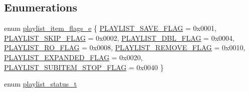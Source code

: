 \subsection*{Enumerations}
\begin{DoxyCompactItemize}
\item 
enum \hyperlink{group__vlc__playlist_ga8e081f83afd54626ee47766bdca9d807}{playlist\+\_\+item\+\_\+flags\+\_\+e} \{ \newline
\hyperlink{group__vlc__playlist_gga8e081f83afd54626ee47766bdca9d807a40f17a1c7fb6b4e10bf4dc5008853df0}{P\+L\+A\+Y\+L\+I\+S\+T\+\_\+\+S\+A\+V\+E\+\_\+\+F\+L\+AG} = 0x0001, 
\hyperlink{group__vlc__playlist_gga8e081f83afd54626ee47766bdca9d807a741ab93586d5d86a665671a22b0ee8b0}{P\+L\+A\+Y\+L\+I\+S\+T\+\_\+\+S\+K\+I\+P\+\_\+\+F\+L\+AG} = 0x0002, 
\hyperlink{group__vlc__playlist_gga8e081f83afd54626ee47766bdca9d807a10a7b303d1fee999da2024bc3587f2af}{P\+L\+A\+Y\+L\+I\+S\+T\+\_\+\+D\+B\+L\+\_\+\+F\+L\+AG} = 0x0004, 
\hyperlink{group__vlc__playlist_gga8e081f83afd54626ee47766bdca9d807ad48dc29aba68fa4b09f67bc826358d70}{P\+L\+A\+Y\+L\+I\+S\+T\+\_\+\+R\+O\+\_\+\+F\+L\+AG} = 0x0008, 
\newline
\hyperlink{group__vlc__playlist_gga8e081f83afd54626ee47766bdca9d807acd6c25537909dce5a91f50d12d44a8f8}{P\+L\+A\+Y\+L\+I\+S\+T\+\_\+\+R\+E\+M\+O\+V\+E\+\_\+\+F\+L\+AG} = 0x0010, 
\hyperlink{group__vlc__playlist_gga8e081f83afd54626ee47766bdca9d807a732f62326a21cd842054d40f8620e16f}{P\+L\+A\+Y\+L\+I\+S\+T\+\_\+\+E\+X\+P\+A\+N\+D\+E\+D\+\_\+\+F\+L\+AG} = 0x0020, 
\hyperlink{group__vlc__playlist_gga8e081f83afd54626ee47766bdca9d807a2fae7fdabe05ad19f3846b93a3d89c9e}{P\+L\+A\+Y\+L\+I\+S\+T\+\_\+\+S\+U\+B\+I\+T\+E\+M\+\_\+\+S\+T\+O\+P\+\_\+\+F\+L\+AG} = 0x0040
 \}
\item 
enum \hyperlink{group__vlc__playlist_gaccdaf2247d258fb3d8d6cb008a7d0cfa}{playlist\+\_\+status\+\_\+t} 
\end{DoxyCompactItemize}
